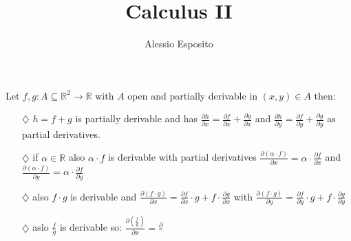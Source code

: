\documentclass{article}
\title{Calculus II}
\author{Alessio Esposito}
\begin{document}
Let $f,g: A \subseteq \mathbb{R}^2 \rightarrow \mathbb{R}$ with $A$ open and partially derivable in $(x,y) \in A$ then:
\begin{itemize}
    \item[$\diamondsuit$] $h = f + g$ is partially derivable and has $\frac{\partial h}{\partial x} = \frac{\partial f}{\partial x} + \frac{\partial g}{\partial x}$ and $\frac{\partial h}{\partial y} = \frac{\partial f}{\partial y} + \frac{\partial g}{\partial y}$ as partial derivatives.
    \item[$\diamondsuit$] if $\alpha \in \mathbb{R}$ also $\alpha \cdot f$ is derivable with partial derivatives $\frac{\partial (\alpha \cdot f)}{\partial x} = \alpha \cdot \frac{\partial f}{\partial x}$ and $\frac{\partial (\alpha \cdot f)}{\partial y} = \alpha \cdot \frac{\partial f}{\partial y}$   
    \item[$\diamondsuit$] also $f \cdot g$ is derivable and $\frac{\partial (f \cdot g)}{\partial x} = \frac{\partial f}{\partial x} \cdot g + f \cdot \frac{\partial g}{\partial x}$ with $\frac{\partial (f \cdot g)}{\partial y} = \frac{\partial f}{\partial y} \cdot g + f \cdot \frac{\partial g}{\partial y}$  
    \item[$\diamondsuit$] aslo $\frac{f}{g}$ is derivable so:  $\frac{\partial (\frac{f}{g})}{\partial x} = \frac{\partial}{}$
\end{itemize}
\end{document}
